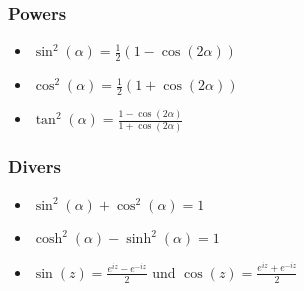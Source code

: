 \documentclass[a4paper,fontsize = 8pt]{scrartcl}
\begin{document}
\subsubsection{Powers}
\begin{itemize}
 \item $\sin^2(\alpha) = \frac{1}{2}(1-\cos(2\alpha))$
 \item $\cos^2(\alpha) = \frac{1}{2}(1+\cos(2\alpha))$
 \item $\tan^2(\alpha) = \frac{1-\cos(2\alpha)}{1+\cos(2\alpha)}$
\end{itemize}

\subsubsection{Divers}

\begin{itemize}
 \item $\sin^2(\alpha) + \cos^2(\alpha) = 1$
 \item $\cosh^2(\alpha) - \sinh^2(\alpha) = 1$
 \item $\sin(z) = \frac{e^{iz} - e^{-iz}}{2}$ und $\cos(z) = \frac{e^{iz} + e^{-iz}}{2}$
\end{itemize}

\begingroup
\renewcommand*{\arraystretch}{2}

\end{document}
